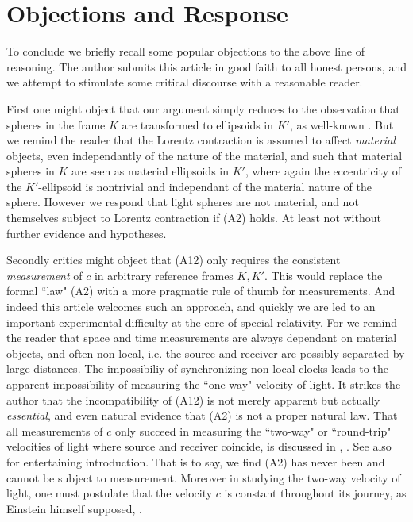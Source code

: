 \documentclass[12pt]{amsart}
\theoremstyle{definition}
\theoremstyle{remark}
\begin{document}







\section{Objections and Response}
To conclude we briefly recall some popular objections to the above line of reasoning. The author submits this article in good faith to all honest persons, and we attempt to stimulate some critical discourse with a reasonable reader.

First one might object that our argument simply reduces to the observation that spheres in the frame $K$ are transformed to ellipsoids in $K'$, as well-known \cite[\S 4]{einstein1905electrodynamics}. But we remind the reader that the Lorentz contraction is assumed to affect \emph{material} objects, even independantly of the nature of the material, and such that material spheres in $K$ are seen as material ellipsoids in $K'$, where again the eccentricity of the $K'$-ellipsoid is nontrivial and independant of the material nature of the sphere. However we respond that light spheres are not material, and not themselves subject to Lorentz contraction if (A2) holds. At least not without further evidence and hypotheses. %

Secondly critics might object that (A12) only requires the consistent \emph{measurement} of $c$ in arbitrary reference frames $K, K'$. This would replace the formal ``law" (A2) with a more pragmatic rule of thumb for measurements. And indeed this article welcomes such an approach, and quickly we are led to an important experimental difficulty at the core of special relativity. For we remind the reader that space and time measurements are always dependant on material objects, and often non local, i.e. the source and receiver are possibly separated by large distances. The impossibiliy of synchronizing non local clocks leads to the apparent impossibility of measuring the ``one-way" velocity of light. It strikes the author that the incompatibility of (A12) is not merely apparent but actually \emph{essential}, and even natural evidence that (A2) is not a proper natural law. That all measurements of $c$ only succeed in measuring the ``two-way" or ``round-trip" velocities of light where source and receiver coincide, is discussed in \cite{zhang1997special}, \cite{israel}. See also \cite{vid} for entertaining introduction. That is to say, we find (A2) has never been and cannot be subject to measurement. Moreover in studying the two-way velocity of light, one must postulate that the velocity $c$ is constant throughout its journey, as Einstein himself supposed, \cite[Ch.8]{einstein2019relativity}.
\end{document}
